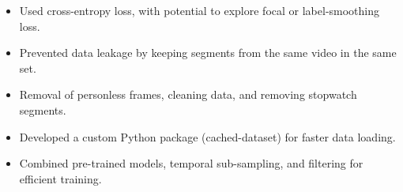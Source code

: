 \begin{frame}

    \vspace{1em}

    \begin{itemize}
        \itemsep1em
        \item Used cross-entropy loss, with potential to explore focal or label-smoothing loss.
        \item Prevented data leakage by keeping segments from the same video in the same set.
        \item Removal of personless frames, cleaning data, and removing stopwatch segments.
        \item Developed a custom Python package (cached-dataset) for faster data loading.
        \item Combined pre-trained models, temporal sub-sampling, and filtering for efficient training.
    \end{itemize}
\end{frame}

